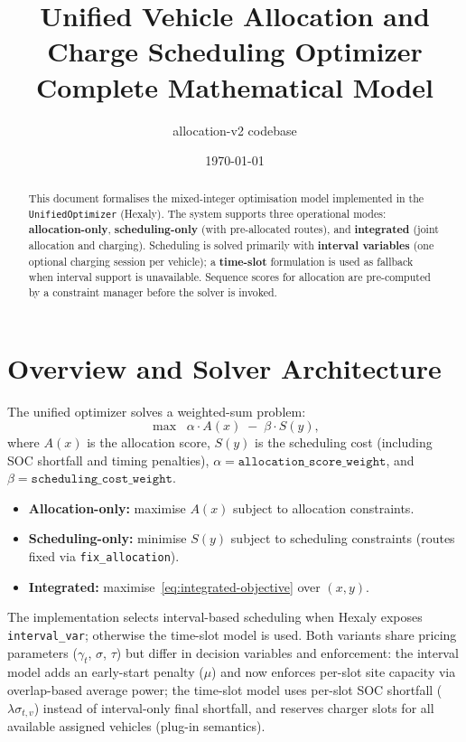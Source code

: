 \documentclass[11pt,a4paper]{article}
\title{Unified Vehicle Allocation and Charge Scheduling Optimizer\\[0.4em]
\large Complete Mathematical Model}
\author{allocation-v2 codebase}
\date{\today}
\newcommand{\1}{\mathbf{1}}
\begin{document}
\maketitle

\begin{abstract}
This document formalises the mixed-integer optimisation model implemented in the
\texttt{UnifiedOptimizer} (Hexaly). The system supports three operational modes:
\textbf{allocation-only}, \textbf{scheduling-only} (with pre-allocated routes), and
\textbf{integrated} (joint allocation and charging). Scheduling is solved primarily with
\textbf{interval variables} (one optional charging session per vehicle); a
\textbf{time-slot} formulation is used as fallback when interval support is unavailable.
Sequence scores for allocation are pre-computed by a constraint manager before the
solver is invoked.
\end{abstract}

\tableofcontents
\newpage

\section{Overview and Solver Architecture}

The unified optimizer solves a weighted-sum problem:
\begin{equation}
  \label{eq:integrated-objective}
  \max \;\; \alpha \cdot A(x) \;-\; \beta \cdot S(y),
\end{equation}
where $A(x)$ is the allocation score, $S(y)$ is the scheduling cost (including SOC
shortfall and timing penalties), $\alpha = \texttt{allocation\_score\_weight}$, and
$\beta = \texttt{scheduling\_cost\_weight}$.

\begin{itemize}[nosep]
  \item \textbf{Allocation-only:} maximise $A(x)$ subject to allocation constraints.
  \item \textbf{Scheduling-only:} minimise $S(y)$ subject to scheduling constraints
        (routes fixed via \texttt{fix\_allocation}).
  \item \textbf{Integrated:} maximise~\eqref{eq:integrated-objective} over $(x,y)$.
\end{itemize}

The implementation selects interval-based scheduling when Hexaly exposes
\texttt{interval\_var}; otherwise the time-slot model is used. Both variants share
pricing parameters ($\gamma_t$, $\sigma$, $\tau$) but differ in decision variables
and enforcement: the interval model adds an early-start penalty ($\mu$) and now
enforces per-slot site capacity via overlap-based average power; the time-slot model
uses per-slot SOC shortfall ($\lambda\sigma_{t,v}$) instead of interval-only final
shortfall, and reserves charger slots for all available assigned vehicles (plug-in
semantics).
\end{document}
